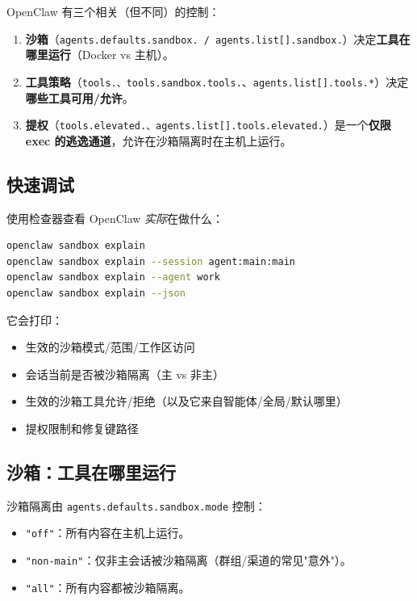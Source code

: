 OpenClaw 有三个相关（但不同）的控制：

\begin{enumerate}
  \item \textbf{沙箱}（\texttt{agents.defaults.sandbox.\textit{} / \texttt{agents.list[].sandbox.}}）决定\textbf{工具在哪里运行}（Docker vs 主机）。
  \item \textbf{工具策略}（\texttt{tools.\textit{}、\texttt{tools.sandbox.tools.}}、\texttt{agents.list[].tools.*}）决定\textbf{哪些工具可用/允许}。
  \item \textbf{提权}（\texttt{tools.elevated.\textit{}、\texttt{agents.list[].tools.elevated.}}）是一个\textbf{仅限 exec 的逃逸通道}，允许在沙箱隔离时在主机上运行。
\end{enumerate}


\subsection{快速调试}


使用检查器查看 OpenClaw \textit{实际}在做什么：

\begin{lstlisting}[language=bash]
openclaw sandbox explain
openclaw sandbox explain --session agent:main:main
openclaw sandbox explain --agent work
openclaw sandbox explain --json
\end{lstlisting}


它会打印：

\begin{itemize}
  \item 生效的沙箱模式/范围/工作区访问
  \item 会话当前是否被沙箱隔离（主 vs 非主）
  \item 生效的沙箱工具允许/拒绝（以及它来自智能体/全局/默认哪里）
  \item 提权限制和修复键路径
\end{itemize}


\subsection{沙箱：工具在哪里运行}


沙箱隔离由 \texttt{agents.defaults.sandbox.mode} 控制：

\begin{itemize}
  \item \texttt{"off"}：所有内容在主机上运行。
  \item \texttt{"non-main"}：仅非主会话被沙箱隔离（群组/渠道的常见"意外"）。
  \item \texttt{"all"}：所有内容都被沙箱隔离。
\end{itemize}


